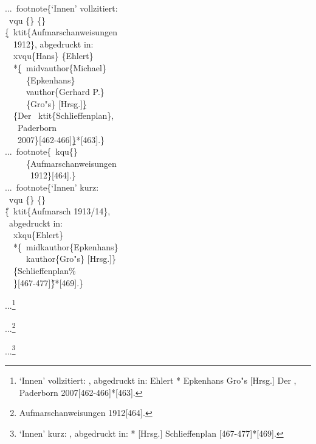 \documentclass[12pt,a4paper]{article}
\newcommand{\pbs}{\string\ \unskip}
\newcommand{\bs}{\protect\pbs}
\begin{document}
\vspace{.5ex}
\Doppelbox
{\scriptsize
 ...\bs footnote\{`Innen' vollzitiert: 
 \\ \bs vqu \{\} \{\} 
 \\ \b{\b{\{}}\bs ktit\{Aufmarschanweisungen 
 \\ \ \ 1912\}, abgedruckt in: 
 \\ \ \bs xvqu\{Hans\} \{Ehlert\} 
 \\{} \ \ *\b{\{}\bs midvauthor\{Michael\}
 \\ \ \ \ \ \ \{Epkenhans\} 
 \\ \ \ \ \ \bs vauthor\{Gerhard P.\} 
 \\ \ \ \ \ \ \{Gro"s\} [Hrsg.]\b{\}} 
 \\ \ \ \{Der \bs ktit\{Schlieffenplan\},
 \\ \ \ \ Paderborn 
 \\ \ \ \ 2007\}[462-466]\b{\b{\}}}*[463].\}
 \\[1ex] ...\bs footnote\{\bs kqu\{\}
 \\ \ \ \ \ \ \{Aufmarschanweisungen 
 \\ \ \ \ \ \ \ 1912\}[464].\}
 \\[1ex] ...\bs footnote\{`Innen' kurz: 
 \\ \bs vqu \{\} \{\} 
 \\ \H{\{}\bs ktit\{Aufmarsch 1913/14\},
 \\ \ abgedruckt in: 
 \\ \ \bs xkqu\{Ehlert\}
 \\{}\ \ *\{\bs midkauthor\{Epkenhans\} 
 \\ \ \ \ \ \bs kauthor\{Gro"s\} [Hrsg.]\}
 \\ \ \ \{Schlieffenplan\%
 \\ \ \ \}[467-477]\H{\}}*[469].\} 
}
{\vspace{9ex}\showbamem
 ...\footnote{`Innen' vollzitiert: \vqu {} {} 
   {, 
   abgedruckt in:  {Ehlert}
   *{ {Epkenhans}
      {Gro"s} [Hrsg.]} 
                {Der ,
     Paderborn 2007}[462-466]}*[463].\label{InnVoll}}
                
   ...\footnote{\kqu{} {Aufmarschanweisungen 1912}[464].\label{zweite}}

 ...\footnote{`Innen' kurz: \vqu {} {} 
    {,
    abgedruckt in: 
    *{  [Hrsg.]}
    {Schlieffenplan%
      }[467-477]}*[469].\label{dritte}}
}
\end{document}
